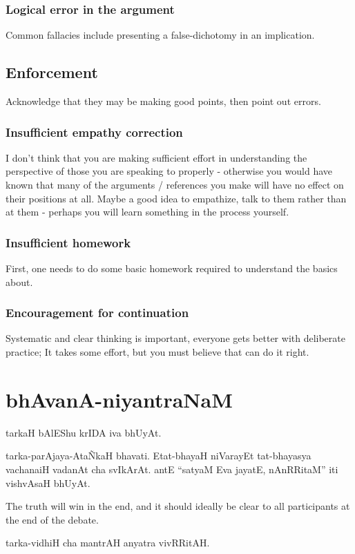 \documentclass[oneside, article]{memoir}
\begin{document}
\subsubsection{Logical error in the argument}
Common fallacies include presenting a false-dichotomy in an implication.

\subsection{Enforcement}
Acknowledge that they may be making good points, then point out errors.

\subsubsection{Insufficient empathy correction}
I don't think that you are making sufficient effort in understanding the perspective of those you are speaking to properly - otherwise you would have known that many of the arguments / references you make will have no effect on their positions at all. Maybe a good idea to empathize, talk to them rather than at them - perhaps you will learn something in the process yourself.

\subsubsection{Insufficient homework}
First, one needs to do some basic homework required to understand the basics about. 

\subsubsection{Encouragement for continuation} Systematic and clear thinking is important, everyone gets better with deliberate practice; It takes some effort, but you must believe that can do it right.

\section{bhAvanA-niyantraNaM}
tarkaH bAlEShu krIDA iva bhUyAt.

tarka-parAjaya-Ata\~NkaH bhavati. Etat-bhayaH niVarayEt tat-bhayasya vachanaiH vadanAt cha svIkArAt. antE ``satyaM Eva jayatE, nAnRRitaM'' iti vishvAsaH bhUyAt.

The truth will win in the end, and it should ideally be clear to all participants at the end of the debate.

tarka-vidhiH cha mantrAH anyatra vivRRitAH.
\end{document}

